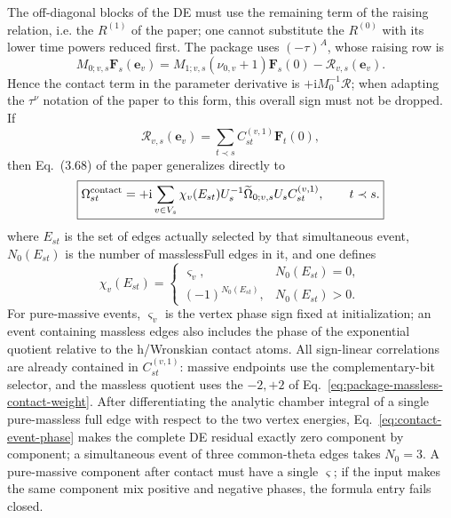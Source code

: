 \documentclass[11pt,a4paper]{article}
\newcommand{\ii}{\mathrm i}
\newcommand{\cR}{\mathcal R}
\begin{document}
The off-diagonal blocks of the DE must use the remaining term of the raising relation, i.e. the $R^{(1)}$ of the paper; one cannot substitute the $R^{(0)}$ with its lower time powers reduced first. The package uses $(-\tau)^A$, whose raising row is
\begin{equation}
 M_{0;v,s}\bm F_s(\bm e_v)
 =M_{1;v,s}(\nu_{0,v}+1)\bm F_s(0)-\cR_{v,s}(\bm e_v).
 \label{eq:package-raising-contact-sign}
\end{equation}
Hence the contact term in the parameter derivative is $+\ii M_0^{-1}\cR$; when adapting the $\tau^\nu$ notation of the paper to this form, this overall sign must not be dropped. If
\begin{equation}
 \cR_{v,s}(\bm e_v)=\sum_{t\prec s}C_{st}^{(v,1)}\bm F_t(0),
\end{equation}
then Eq.~(3.68) of the paper generalizes directly to
\begin{equation}
 \boxed{
 \Omega_{st}^{\rm contact}
 =+\ii\sum_{v\in V_s}\chi_v(E_{st})
 U_s^{-1}\widetilde\Omega_{0;v,s}U_s
 C_{st}^{(v,1)},
 \qquad t\prec s.
 }
 \label{eq:global-offdiagonal-omega}
\end{equation}
where $E_{st}$ is the set of edges actually selected by that simultaneous event, $N_0(E_{st})$ is the number of masslessFull edges in it, and one defines
\begin{equation}
 \chi_v(E_{st})=
 \begin{cases}
  \varsigma_v,&N_0(E_{st})=0,\\
  (-1)^{N_0(E_{st})},&N_0(E_{st})>0.
 \end{cases}
 \label{eq:contact-event-phase}
\end{equation}
For pure-massive events, $\varsigma_v$ is the vertex phase sign fixed at initialization; an event containing massless edges also includes the phase of the exponential quotient relative to the h/Wronskian contact atoms. All sign-linear correlations are already contained in $C_{st}^{(v,1)}$: massive endpoints use the complementary-bit selector, and the massless quotient uses the $-2,+2$ of Eq.~\eqref{eq:package-massless-contact-weight}. After differentiating the analytic chamber integral of a single pure-massless full edge with respect to the two vertex energies, Eq.~\eqref{eq:contact-event-phase} makes the complete DE residual exactly zero component by component; a simultaneous event of three common-theta edges takes $N_0=3$. A pure-massive component after contact must have a single $\varsigma$; if the input makes the same component mix positive and negative phases, the formula entry fails closed.
\end{document}
